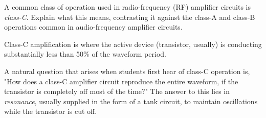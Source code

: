 

A common class of operation used in radio-frequency (RF) amplifier circuits is {\it class-C}.  Explain what this means, contrasting it against the class-A and class-B operations common in audio-frequency amplifier circuits.







Class-C amplification is where the active device (transistor, usually) is conducting substantially less than 50\% of the waveform period.







A natural question that arises when students first hear of class-C operation is, "How does a class-C amplifier circuit reproduce the entire waveform, if the transistor is completely off most of the time?"  The answer to this lies in {\it resonance}, usually supplied in the form of a tank circuit, to maintain oscillations while the transistor is cut off.




